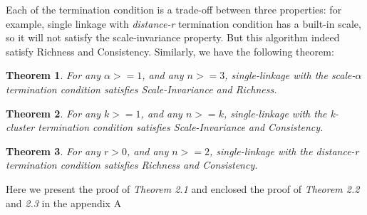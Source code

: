 \documentclass{uonmathreport}
\newtheorem{theorem}{Theorem}[section]
\begin{document}
Each of the termination condition is a trade-off between three properties: for example, single linkage with \textit{distance-r} termination condition has a built-in scale, so it will not satisfy the scale-invariance property. But this algorithm indeed satisfy Richness and Consistency. Similarly, we have the following theorem:
\begin{theorem}
\label{first theorem}
For any $\alpha>=1$, and any $n>=3$, single-linkage with the scale-$\alpha$ termination condition satisfies Scale-Invariance and Richness.
\end{theorem}
\begin{theorem}
\label{second theorem}
For any $k>=1$, and any $n>=k$, single-linkage with the k-cluster termination condition satisfies Scale-Invariance and Consistency.
\end{theorem}
\begin{theorem}
\label{third theorem}
For any $r>0$, and any $n>=2$, single-linkage with the distance-r termination condition satisfies Richness and Consistency.
\end{theorem}

Here we present the proof of \textit{Theorem 2.1} and enclosed the proof of \textit{Theorem 2.2} and \textit{2.3} in the appendix A
\end{document}
